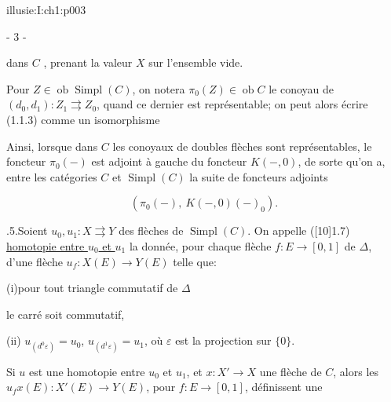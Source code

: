 \IllusieSetPhysicalPageSize{447bp}{698.6bp}
\begin{illusiebodypage}{illusie:I:ch1:p003}
\begin{center}- 3 -\end{center}
\vspace{7bp}\fontsize{9}{14}\selectfont

\hypertarget{illusie:I:ch1:s1:1:p5c1}{}%
\noindent dans $C$ , prenant la valeur $X$ sur l'ensemble vide.

\hypertarget{illusie:I:ch1:s1:1:p6}{}%
Pour $Z\in\operatorname{ob}\operatorname{Simpl}(C)$, on notera
$\pi_0(Z)\in\operatorname{ob}C$ le conoyau de\\
$(d_0,d_1):Z_1\rightrightarrows Z_0$, quand ce dernier est représentable; on
peut alors écrire\\(1.1.3) comme un isomorphisme

\hypertarget{illusie:I:ch1:s1:1:eq4}{}%
\noindent{}\par

Ainsi, lorsque dans $C$ les conoyaux de doubles flèches sont représentables,
le foncteur $\pi_0(-)$ est adjoint à gauche du foncteur $K(-,0)$, de sorte
qu'on a, entre les catégories $C$ et $\operatorname{Simpl}(C)$ la suite de
foncteurs adjoints

\hypertarget{illusie:I:ch1:s1:1:d4}{}%
\[ (\pi_0(-),\ K(-,0)(-)_0). \]

\hypertarget{illusie:I:ch1:s1:1:p7}{}%
.5.\quad Soient $u_0,u_1:X\rightrightarrows Y$ des flèches de
$\operatorname{Simpl}(C)$. On appelle ([10]1.7)\\
\underline{homotopie entre $u_0$ et $u_1$} la donnée, pour chaque flèche
$f:E\longrightarrow[0,1]$ de $\Delta$,\\d'une flèche
$u_f:X(E)\longrightarrow Y(E)$ telle que:

\hypertarget{illusie:I:ch1:s1:1:d5}{}%
\hspace*{34bp}(i)\quad pour tout triangle commutatif de $\Delta$
\IllusieHomotopyTriangle

\hypertarget{illusie:I:ch1:s1:1:d6}{}%
\noindent le carré
\IllusieHomotopySquare
\noindent soit commutatif,

\hypertarget{illusie:I:ch1:s1:1:p8}{}%
\hspace*{34bp}(ii)\quad
$u_{(d^0\varepsilon)}=u_0$, $u_{(d^1\varepsilon)}=u_1$, où $\varepsilon$ est
la projection sur $\{0\}$.

\hypertarget{illusie:I:ch1:s1:1:p9}{}%
Si $u$ est une homotopie entre $u_0$ et $u_1$, et
$x:X'\longrightarrow X$ une flèche de $C$, alors les
$u_f x(E):X'(E)\longrightarrow Y(E)$, pour $f:E\longrightarrow[0,1]$,
définissent une
\end{illusiebodypage}
